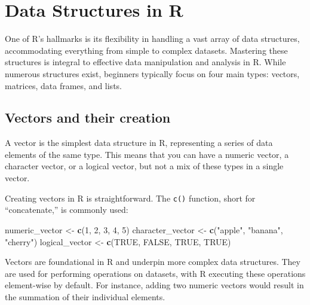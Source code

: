 \documentclass[
  b5paper]{book}
\newenvironment{Shaded}{\begin{snugshade}}{\end{snugshade}}
\newcommand{\ConstantTok}[1]{\textcolor[rgb]{0.56,0.35,0.01}{#1}}
\newcommand{\DecValTok}[1]{\textcolor[rgb]{0.00,0.00,0.81}{#1}}
\newcommand{\FunctionTok}[1]{\textcolor[rgb]{0.13,0.29,0.53}{\textbf{#1}}}
\newcommand{\NormalTok}[1]{#1}
\newcommand{\OtherTok}[1]{\textcolor[rgb]{0.56,0.35,0.01}{#1}}
\newcommand{\StringTok}[1]{\textcolor[rgb]{0.31,0.60,0.02}{#1}}
\begin{document}
\hypertarget{data-structures-in-r}{%
\section{Data Structures in R}\label{data-structures-in-r}}

One of R's hallmarks is its flexibility in handling a vast array of data structures, accommodating everything from simple to complex datasets. Mastering these structures is integral to effective data manipulation and analysis in R. While numerous structures exist, beginners typically focus on four main types: vectors, matrices, data frames, and lists.

\hypertarget{vectors-and-their-creation}{%
\subsection*{Vectors and their creation}\label{vectors-and-their-creation}}

A vector is the simplest data structure in R, representing a series of data elements of the same type. This means that you can have a numeric vector, a character vector, or a logical vector, but not a mix of these types in a single vector.

Creating vectors in R is straightforward. The \texttt{c()} function, short for ``concatenate,'' is commonly used:

\begin{Shaded}
\begin{Highlighting}[]
\NormalTok{numeric\_vector }\OtherTok{\textless{}{-}} \FunctionTok{c}\NormalTok{(}\DecValTok{1}\NormalTok{, }\DecValTok{2}\NormalTok{, }\DecValTok{3}\NormalTok{, }\DecValTok{4}\NormalTok{, }\DecValTok{5}\NormalTok{)}
\NormalTok{character\_vector }\OtherTok{\textless{}{-}} \FunctionTok{c}\NormalTok{(}\StringTok{"apple"}\NormalTok{, }\StringTok{"banana"}\NormalTok{, }\StringTok{"cherry"}\NormalTok{)}
\NormalTok{logical\_vector }\OtherTok{\textless{}{-}} \FunctionTok{c}\NormalTok{(}\ConstantTok{TRUE}\NormalTok{, }\ConstantTok{FALSE}\NormalTok{, }\ConstantTok{TRUE}\NormalTok{, }\ConstantTok{TRUE}\NormalTok{)}
\end{Highlighting}
\end{Shaded}

Vectors are foundational in R and underpin more complex data structures. They are used for performing operations on datasets, with R executing these operations element-wise by default. For instance, adding two numeric vectors would result in the summation of their individual elements.
\end{document}
